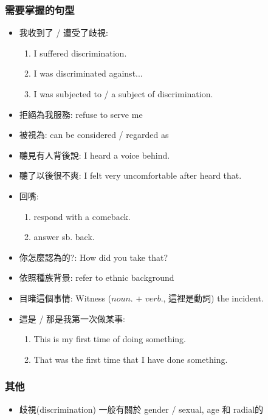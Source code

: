 \subsubsection*{需要掌握的句型}
\begin{itemize}
  \itemsep0em
  \item 我收到了 / 遭受了歧視:
  \begin{enumerate}
    \itemsep0em
    \item I suffered discrimination.
    \item I was discriminated against...
    \item I was subjected to / a subject of discrimination.
  \end{enumerate}
  \item 拒絕為我服務: refuse to serve me
  \item 被視為: can be considered / regarded as
  \item 聽見有人背後說: I heard a voice behind.
  \item 聽了以後很不爽: I felt very uncomfortable after heard that.
  \item 回嘴:
  \begin{enumerate}
    \itemsep0em
    \item respond with a comeback.
    \item answer sb. back.
  \end{enumerate}
  \item 你怎麼認為的?: How did you take that?
  \item 依照種族背景: refer to ethnic background
  \item 目睹這個事情: Witness ($noun.$ + $verb.$, 這裡是動詞) the incident.
  \item 這是 / 那是我第一次做某事:
  \begin{enumerate}
    \itemsep0em
    \item This is my first time of doing something.
    \item That was the first time that I have done something.
  \end{enumerate}
\end{itemize}

\subsubsection*{其他}
\begin{itemize}
  \itemsep0em
  \item 歧視(discrimination) 一般有關於 gender / sexual, age 和 radial的
\end{itemize}


